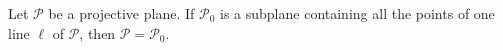 Let $\mathcal{P}$ be a projective plane. If $\mathcal{P}_0$ is a subplane containing all the points of one line $\ell$ of $\mathcal{P}$, then $\mathcal{P} = \mathcal{P}_0$.
